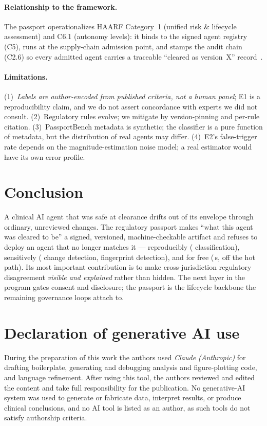 \documentclass[11pt]{article}
\begin{document}
\paragraph{Relationship to the framework.} The passport operationalizes HAARF
Category~1 (unified risk \& lifecycle assessment) and C6.1 (autonomy levels): it
binds to the signed agent registry (C5), runs at the supply-chain admission point, and
stamps the audit chain (C2.6) so every admitted agent carries a traceable ``cleared as
version~X'' record~\cite{schwoebel2026haarf}.

\paragraph{Limitations.} (1)~\emph{Labels are author-encoded from published criteria,
not a human panel}; E1 is a reproducibility claim, and we do not assert concordance
with experts we did not consult. (2)~Regulatory rules evolve; we mitigate by
version-pinning and per-rule citation. (3)~PassportBench metadata is synthetic; the
classifier is a pure function of metadata, but the distribution of real agents may
differ. (4)~E2's false-trigger rate depends on the magnitude-estimation noise model; a
real estimator would have its own error profile.

\section{Conclusion}
A clinical AI agent that was safe at clearance drifts out of its envelope through
ordinary, unreviewed changes. The regulatory passport makes ``what this agent was
cleared to be'' a signed, versioned, machine-checkable artifact and refuses to deploy
an agent that no longer matches it --- reproducibly (\ClaOverall{} classification),
sensitively (\Pgd{} change detection, \Cfd{} fingerprint detection), and for free
(\GateMedian\,\textmu s, off the hot path). Its most important contribution is to make
cross-jurisdiction regulatory disagreement \emph{visible and explained} rather than
hidden. The next layer in the program gates consent and disclosure; the passport is
the lifecycle backbone the remaining governance loops attach to.

\section*{Declaration of generative AI use}
During the preparation of this work the authors used \emph{Claude (Anthropic)} for
drafting boilerplate, generating and debugging analysis and figure-plotting code, and
language refinement. After using this tool, the authors reviewed and edited the
content and take full responsibility for the publication. No generative-AI system was
used to generate or fabricate data, interpret results, or produce clinical
conclusions, and no AI tool is listed as an author, as such tools do not satisfy
authorship criteria.
\end{document}
